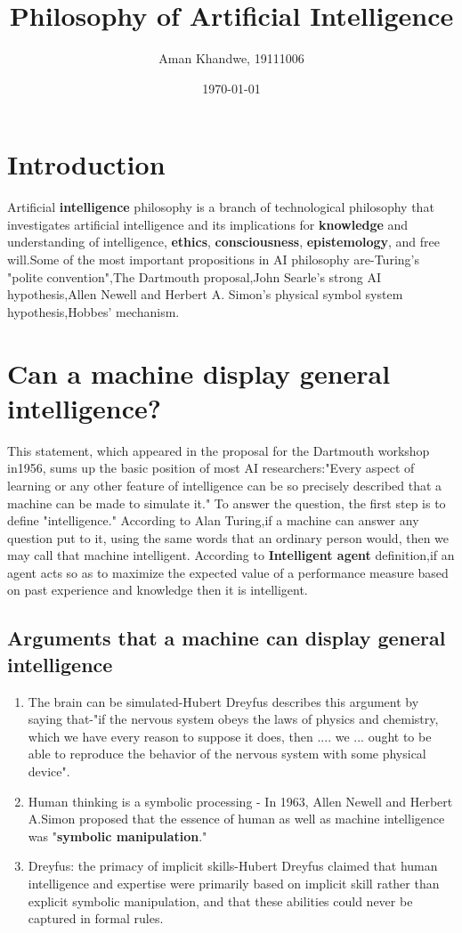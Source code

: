 \documentclass{article}
\title{Philosophy of  Artificial Intelligence}
\author{Aman Khandwe, 19111006}
\date{\today}
\begin{document}
\maketitle

\section{Introduction}
Artificial \textbf{intelligence} philosophy is a branch of technological philosophy that investigates artificial intelligence and its implications for \textbf{knowledge} and understanding of intelligence, \textbf{ethics}, \textbf{consciousness}, \textbf{epistemology}, and free will.Some of the most important propositions in AI philosophy are-Turing's "polite convention",The Dartmouth proposal,John Searle's strong AI hypothesis,Allen Newell and Herbert A. Simon's physical symbol system hypothesis,Hobbes' mechanism.
\section{Can a machine display general intelligence?}
This statement, which appeared in the proposal for the Dartmouth workshop in1956, sums up the basic position of most AI researchers:"Every aspect of learning or any other feature of intelligence can be so precisely described that a machine can be made to simulate it."
To answer the question, the first step is to define "intelligence."
According to Alan Turing,if a machine can answer any question put to it, using the same words that an ordinary person would, then we may call that machine intelligent.
According to \textbf{Intelligent agent} definition,if an agent acts so as to maximize the expected value of a performance measure based on past experience and knowledge then it is intelligent.
\subsection{Arguments that a machine can display general intelligence}
\begin{enumerate}
\item The brain can be simulated-Hubert Dreyfus describes this argument by saying that-"if the nervous system obeys the laws of physics and chemistry, which we have every reason to suppose it does, then .... we ... ought to be able to reproduce the behavior of the nervous system with some physical device".
\item Human thinking is a symbolic processing - In 1963, Allen Newell and Herbert A.Simon proposed that the essence of human as well as machine intelligence was "\textbf{symbolic manipulation}."
\item Dreyfus: the primacy of implicit skills-Hubert Dreyfus claimed that human intelligence and expertise were primarily based on implicit skill rather than explicit symbolic manipulation, and that these abilities could never be captured in formal rules.
\end{enumerate}
\end{document}
